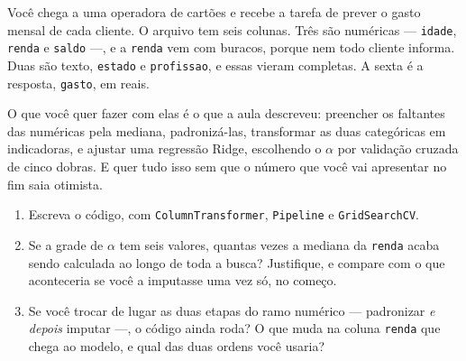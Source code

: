 \documentclass[11pt,a4paper]{article}
\begin{document}
\begin{exercicio}
Você chega a uma operadora de cartões e recebe a tarefa de prever o gasto mensal de
cada cliente. O arquivo tem seis colunas. Três são numéricas --- \texttt{idade},
\texttt{renda} e \texttt{saldo} ---, e a \texttt{renda} vem com buracos, porque nem
todo cliente informa. Duas são texto, \texttt{estado} e \texttt{profissao}, e essas
vieram completas. A sexta é a resposta, \texttt{gasto}, em reais.

O que você quer fazer com elas é o que a aula descreveu: preencher os faltantes
das numéricas pela mediana, padronizá-las, transformar as duas categóricas em
indicadoras, e ajustar uma regressão Ridge, escolhendo o $\alpha$ por validação
cruzada de cinco dobras. E quer tudo isso sem que o
número que você vai apresentar no fim saia otimista.
\begin{enumerate}[label=(\alph*),leftmargin=1.1cm]
  \item Escreva o código, com \texttt{ColumnTransformer}, \texttt{Pipeline} e
        \texttt{GridSearchCV}.
  \item Se a grade de $\alpha$ tem seis valores, quantas vezes a mediana da
        \texttt{renda} acaba sendo calculada ao longo de toda a busca? Justifique,
        e compare com o que aconteceria se você a imputasse uma vez só, no começo.
  \item Se você trocar de lugar as duas etapas do ramo numérico --- padronizar
        \emph{e depois} imputar ---, o código ainda roda? O que muda na coluna
        \texttt{renda} que chega ao modelo, e qual das duas ordens você usaria?
\end{enumerate}
\end{exercicio}
\end{document}
